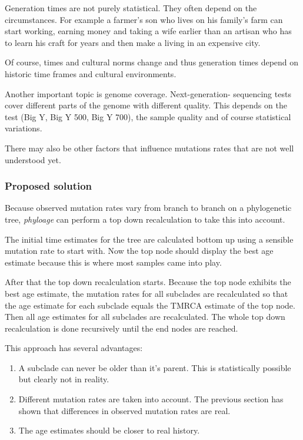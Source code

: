 Generation times are not purely statistical. They often depend
on the circumstances. For example a farmer's son who lives on his
family's farm can start working, earning money and taking a wife
earlier than an artisan who has to learn his craft for years and
then make a living in an expensive city.

Of course, times and cultural norms change and thus generation
times depend on historic time frames and cultural environments.

Another important topic is genome coverage. Next-generation-
sequencing tests cover different parts of the genome with different
quality. This depends on the test (Big Y, Big Y 500, Big Y 700),
the sample quality and of course statistical variations.

There may also be other factors that influence mutations rates
that are not well understood yet. 

\subsubsection*{Proposed solution}

Because observed mutation rates vary from branch to branch on
a phylogenetic tree, \emph{phyloage} can perform a top down
recalculation to take this into account.

The initial time estimates for the tree are calculated bottom up
using a sensible mutation rate to start with. Now the top
node should display the best age estimate because this is where most
samples came into play.

After that the top down recalculation starts. Because the top node
exhibits the best age estimate, the mutation rates for all subclades
are recalculated so that the age estimate for each subclade equals
the TMRCA estimate of the top node. Then all age estimates for all
subclades are recalculated. The whole top down recalculation is done
recursively until the end nodes are reached.

This approach has several advantages:

\begin{enumerate}
\item A subclade can never be older than it's parent.
    This is statistically possible but clearly not in reality.
\item Different mutation rates are taken into account. The
    previous section has shown that differences in observed mutation
    rates are real.
\item The age estimates should be closer to real history.
\end{enumerate}



